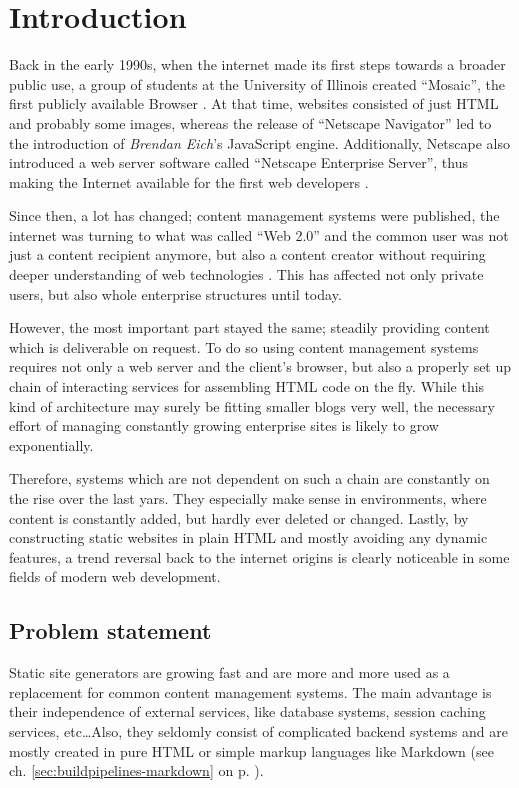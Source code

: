 \chapter{Introduction}
\label{cha:introduction}
Back in the early 1990s, when the internet made its first steps towards a broader public use, a group of students at the University of Illinois created ``Mosaic'', the first publicly available Browser \cite[11]{dhillon2016}. At that time, websites consisted of just HTML and probably some images, whereas the release of ``Netscape Navigator'' led to the introduction of \emph{Brendan Eich}'s JavaScript engine. Additionally, Netscape also introduced a web server software called ``Netscape Enterprise Server'', thus making the Internet available for the first web developers \cite[12]{dhillon2016}.

Since then, a lot has changed; content management systems were published, the internet was turning to what was called ``Web 2.0'' and the common user was not just a content recipient anymore, but also a content creator without requiring deeper understanding of web technologies \cite[19]{dhillon2016}. This has affected not only private users, but also whole enterprise structures until today.

However, the most important part stayed the same; steadily providing content which is deliverable on request. To do so using content management systems requires not only a web server and the client's browser, but also a properly set up chain of interacting services for assembling HTML code on the fly. While this kind of architecture may surely be fitting smaller blogs very well, the necessary effort of managing constantly growing enterprise sites is likely to grow exponentially.

Therefore, systems which are not dependent on such a chain are constantly on the rise over the last yars. They especially make sense in environments, where content is constantly added, but hardly ever deleted or changed. Lastly, by constructing static websites in plain HTML and mostly avoiding any dynamic features, a trend reversal back to the internet origins is clearly noticeable in some fields of modern web development.

\section{Problem statement}
\label{sec:staticsitegenerators}
Static site generators are growing fast and are more and more used as a replacement for common content management systems. The main advantage is their independence of external services, like database systems, session caching services, etc\ldots Also, they seldomly consist of complicated backend systems and are mostly created in pure HTML or simple markup languages like Markdown (see ch. \ref{sec:buildpipelines-markdown} on p. \pageref{sec:buildpipelines-markdown}).


